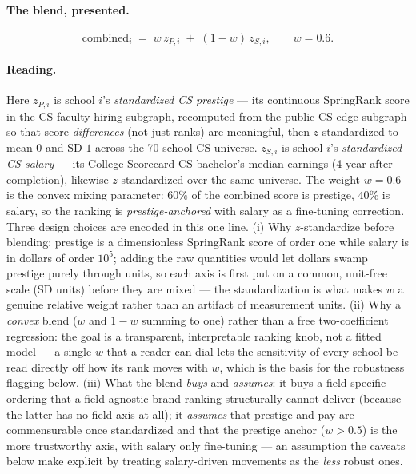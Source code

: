 \documentclass[11pt]{article}
\begin{document}
\paragraph{The blend, presented.}
\[
\text{combined}_i \;=\; w\,z_{P,i} \;+\; (1-w)\,z_{S,i}, \qquad w = 0.6 .
\]

\paragraph{Reading.} Here $z_{P,i}$ is school $i$'s \emph{standardized CS prestige} --- its continuous SpringRank score in the CS faculty-hiring subgraph, recomputed from the public CS edge subgraph so that score \emph{differences} (not just ranks) are meaningful, then $z$-standardized to mean $0$ and SD $1$ across the 70-school CS universe. $z_{S,i}$ is school $i$'s \emph{standardized CS salary} --- its College Scorecard CS bachelor's median earnings (4-year-after-completion), likewise $z$-standardized over the same universe. The weight $w=0.6$ is the convex mixing parameter: $60\%$ of the combined score is prestige, $40\%$ is salary, so the ranking is \emph{prestige-anchored} with salary as a fine-tuning correction. Three design choices are encoded in this one line. (i) Why $z$-standardize before blending: prestige is a dimensionless SpringRank score of order one while salary is in dollars of order $10^5$; adding the raw quantities would let dollars swamp prestige purely through units, so each axis is first put on a common, unit-free scale (SD units) before they are mixed --- the standardization is what makes $w$ a genuine relative weight rather than an artifact of measurement units. (ii) Why a \emph{convex} blend ($w$ and $1-w$ summing to one) rather than a free two-coefficient regression: the goal is a transparent, interpretable ranking knob, not a fitted model --- a single $w$ that a reader can dial lets the sensitivity of every school be read directly off how its rank moves with $w$, which is the basis for the robustness flagging below. (iii) What the blend \emph{buys} and \emph{assumes}: it buys a field-specific ordering that a field-agnostic brand ranking structurally cannot deliver (because the latter has no field axis at all); it \emph{assumes} that prestige and pay are commensurable once standardized and that the prestige anchor ($w>0.5$) is the more trustworthy axis, with salary only fine-tuning --- an assumption the caveats below make explicit by treating salary-driven movements as the \emph{less} robust ones.
\end{document}
